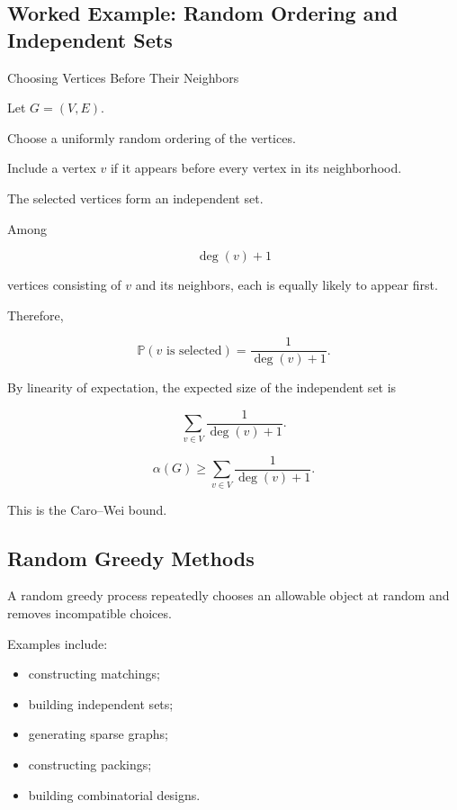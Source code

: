 \subsection{Worked Example: Random Ordering and Independent Sets}
\label{subsec:worked-random-ordering-independent}

\begin{workedexamplebox}{Choosing Vertices Before Their Neighbors}

Let \(G=(V,E)\).

Choose a uniformly random ordering of the vertices.

Include a vertex \(v\) if it appears before every vertex in its
neighborhood.

The selected vertices form an independent set.

Among

\[
\deg(v)+1
\]

vertices consisting of \(v\) and its neighbors, each is equally likely
to appear first.

Therefore,

\[
\mathbb{P}(v\text{ is selected})
=
\frac{1}{\deg(v)+1}.
\]

By linearity of expectation, the expected size of the independent set
is

\[
\sum_{v\in V}
\frac{1}{\deg(v)+1}.
\]

\begin{answerbox}
\[
\boxed{
\alpha(G)
\geq
\sum_{v\in V}
\frac{1}{\deg(v)+1}.
}
\]
\end{answerbox}

This is the Caro--Wei bound.

\end{workedexamplebox}

\subsection{Random Greedy Methods}
\label{subsec:random-greedy-methods}

A random greedy process repeatedly chooses an allowable object at random
and removes incompatible choices.

Examples include:

\begin{itemize}
    \item constructing matchings;
    \item building independent sets;
    \item generating sparse graphs;
    \item constructing packings;
    \item building combinatorial designs.
\end{itemize}

